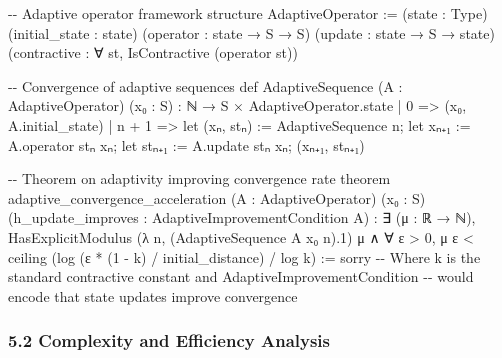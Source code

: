 \documentclass[
]{article}
\newenvironment{Shaded}{}{}
\newcommand{\NormalTok}[1]{#1}
\begin{document}
\begin{Shaded}
\begin{Highlighting}[]
\NormalTok{{-}{-} Adaptive operator framework}
\NormalTok{structure AdaptiveOperator :=}
\NormalTok{  (state : Type)}
\NormalTok{  (initial\_state : state)}
\NormalTok{  (operator : state → S → S)}
\NormalTok{  (update : state → S → state)}
\NormalTok{  (contractive : ∀ st, IsContractive (operator st))}

\NormalTok{{-}{-} Convergence of adaptive sequences}
\NormalTok{def AdaptiveSequence (A : AdaptiveOperator) (x₀ : S) : ℕ → S × AdaptiveOperator.state}
\NormalTok{| 0     =\textgreater{} (x₀, A.initial\_state)}
\NormalTok{| n + 1 =\textgreater{} let (xₙ, stₙ) := AdaptiveSequence n;}
\NormalTok{           let xₙ₊₁ := A.operator stₙ xₙ;}
\NormalTok{           let stₙ₊₁ := A.update stₙ xₙ;}
\NormalTok{           (xₙ₊₁, stₙ₊₁)}

\NormalTok{{-}{-} Theorem on adaptivity improving convergence rate}
\NormalTok{theorem adaptive\_convergence\_acceleration}
\NormalTok{  (A : AdaptiveOperator) (x₀ : S) (h\_update\_improves : AdaptiveImprovementCondition A) :}
\NormalTok{  ∃ (μ : ℝ → ℕ), HasExplicitModulus (λ n, (AdaptiveSequence A x₀ n).1) μ ∧}
\NormalTok{                  ∀ ε \textgreater{} 0, μ ε \textless{} ceiling (log (ε * (1 {-} k) / initial\_distance) / log k) :=}
\NormalTok{  sorry {-}{-} Where k is the standard contractive constant and AdaptiveImprovementCondition}
\NormalTok{        {-}{-} would encode that state updates improve convergence}
\end{Highlighting}
\end{Shaded}

\subsubsection{5.2 Complexity and Efficiency
Analysis}\label{complexity-and-efficiency-analysis}
\end{document}
